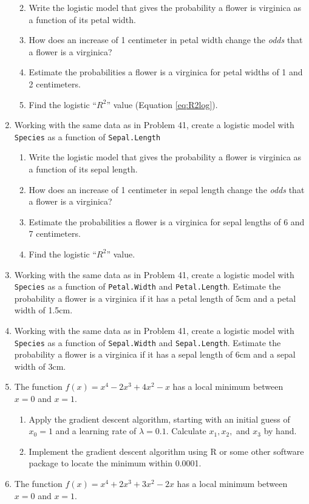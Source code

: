 \documentclass[
]{book}
\providecommand{\tightlist}{%
  \setlength{\itemsep}{0pt}\setlength{\parskip}{0pt}}
\theoremstyle{definition}
\theoremstyle{definition}
\theoremstyle{definition}
\theoremstyle{definition}
\theoremstyle{remark}
\begin{document}
\begin{enumerate}
  \begin{enumerate}
  \def\labelenumii{\alph{enumii}.}
  \tightlist
  \item
    Write the logistic model that gives the probability a flower is virginica as a function of its petal width.
  \item
    How does an increase of 1 centimeter in petal width change the \emph{odds} that a flower is a virginica?
  \item
    Estimate the probabilities a flower is a virginica for petal widths of 1 and 2 centimeters.
  \item
    Find the logistic ``\(R^2\)'' value (Equation \eqref{eq:R2log}).
  \end{enumerate}
\item
  Working with the same data as in Problem 41, create a logistic model with \texttt{Species} as a function of \texttt{Sepal.Length}

  \begin{enumerate}
  \def\labelenumii{\alph{enumii}.}
  \tightlist
  \item
    Write the logistic model that gives the probability a flower is virginica as a function of its sepal length.
  \item
    How does an increase of 1 centimeter in sepal length change the \emph{odds} that a flower is a virginica?
  \item
    Estimate the probabilities a flower is a virginica for sepal lengths of 6 and 7 centimeters.
  \item
    Find the logistic ``\(R^2\)'' value.
  \end{enumerate}
\item
  Working with the same data as in Problem 41, create a logistic model with \texttt{Species} as a function of \texttt{Petal.Width} and \texttt{Petal.Length}. Estimate the probability a flower is a virginica if it has a petal length of 5cm and a petal width of 1.5cm.
\item
  Working with the same data as in Problem 41, create a logistic model with \texttt{Species} as a function of \texttt{Sepal.Width} and \texttt{Sepal.Length}. Estimate the probability a flower is a virginica if it has a sepal length of 6cm and a sepal width of 3cm.
\item
  The function \(f(x)=x^4-2x^3+4x^2-x\) has a local minimum between \(x=0\) and \(x=1.\)

  \begin{enumerate}
  \def\labelenumii{\alph{enumii}.}
  \tightlist
  \item
    Apply the gradient descent algorithm, starting with an initial guess of \(x_0=1\) and a learning rate of \(\lambda=0.1.\) Calculate \(x_1,x_2,\) and \(x_3\) by hand.
  \item
    Implement the gradient descent algorithm using R or some other software package to locate the minimum within 0.0001.
  \end{enumerate}
\item
  The function \(f(x)=x^4+2x^3+3x^2-2x\) has a local minimum between \(x=0\) and \(x=1.\)


\end{enumerate}
\end{document}
